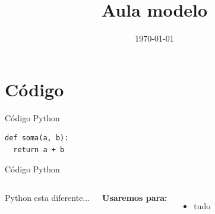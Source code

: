 \documentclass{beamer}
\title{Aula modelo}
\date{\today}
\begin{document}
    


\sumario

\section{Código}

\begin{frame}[fragile]{Código Python}
    \begin{verbatim}
def soma(a, b):
  return a + b
    \end{verbatim}
\end{frame}

\begin{frame}[fragile]{Código Python}
    \begin{columns}[t]
            
        Python esta diferente...
        
        \textbf{Usaremos para:}
        \begin{itemize}
            \item tudo
        \end{itemize}
    
        
        
    \end{columns}   
\end{frame}
\end{document}
